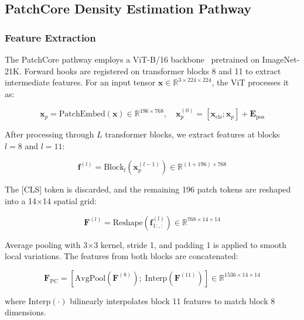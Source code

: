 \documentclass[journal]{IEEEtran}
\begin{document}
\subsection{PatchCore Density Estimation Pathway}
\label{sec:patchcore}

\subsubsection{Feature Extraction}

The PatchCore pathway employs a ViT-B/16 backbone~\cite{dosovitskiy2021vit} pretrained on ImageNet-21K. Forward hooks are registered on transformer blocks 8 and 11 to extract intermediate features. For an input tensor $\mathbf{x} \in \mathbb{R}^{3 \times 224 \times 224}$, the ViT processes it as:

\begin{equation}
    \mathbf{x}_p = \text{PatchEmbed}(\mathbf{x}) \in \mathbb{R}^{196 \times 768}, \quad \mathbf{x}_p^{(0)} = [\mathbf{x}_{\text{cls}}; \mathbf{x}_p] + \mathbf{E}_{\text{pos}}
    \label{eq:vit_embed}
\end{equation}

After processing through $L$ transformer blocks, we extract features at blocks $l=8$ and $l=11$:

\begin{equation}
    \mathbf{f}^{(l)} = \text{Block}_l(\mathbf{x}_p^{(l-1)}) \in \mathbb{R}^{(1+196) \times 768}
    \label{eq:vit_features}
\end{equation}

The [CLS] token is discarded, and the remaining 196 patch tokens are reshaped into a 14$\times$14 spatial grid:

\begin{equation}
    \mathbf{F}^{(l)} = \text{Reshape}\left(\mathbf{f}^{(l)}_{1:, :}\right) \in \mathbb{R}^{768 \times 14 \times 14}
    \label{eq:spatial_feat}
\end{equation}

Average pooling with 3$\times$3 kernel, stride 1, and padding 1 is applied to smooth local variations. The features from both blocks are concatenated:

\begin{equation}
    \mathbf{F}_{\text{PC}} = \left[\text{AvgPool}(\mathbf{F}^{(8)});\; \text{Interp}(\mathbf{F}^{(11)})\right] \in \mathbb{R}^{1536 \times 14 \times 14}
    \label{eq:concat_feat}
\end{equation}

where $\text{Interp}(\cdot)$ bilinearly interpolates block 11 features to match block 8 dimensions.
\end{document}
